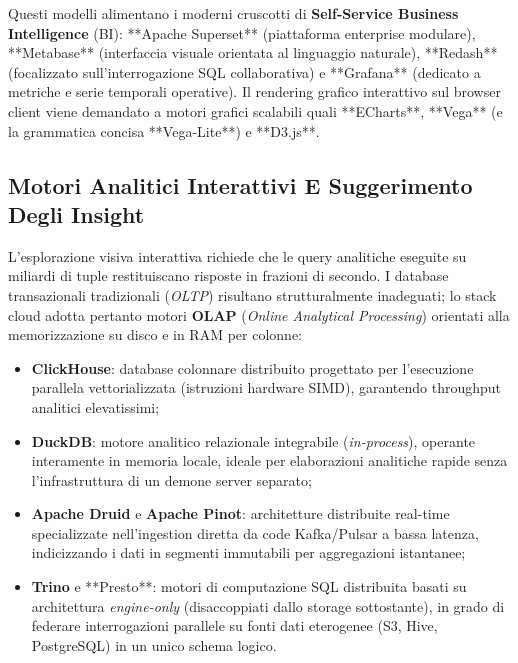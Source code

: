 \documentclass[11pt, a4paper]{article}
\begin{document}
Questi modelli alimentano i moderni cruscotti di \textbf{Self-Service Business Intelligence} (BI): **Apache Superset** (piattaforma enterprise modulare), **Metabase** (interfaccia visuale orientata al linguaggio naturale), **Redash** (focalizzato sull'interrogazione SQL collaborativa) e **Grafana** (dedicato a metriche e serie temporali operative). Il rendering grafico interattivo sul browser client viene demandato a motori grafici scalabili quali **ECharts**, **Vega** (e la grammatica concisa **Vega-Lite**) e **D3.js**.


\subsection{Motori Analitici Interattivi E Suggerimento Degli Insight}

L'esplorazione visiva interattiva richiede che le query analitiche eseguite su miliardi di tuple restituiscano risposte in frazioni di secondo. I database transazionali tradizionali (\emph{OLTP}) risultano strutturalmente inadeguati; lo stack cloud adotta pertanto motori \textbf{OLAP} (\emph{Online Analytical Processing}) orientati alla memorizzazione su disco e in RAM per colonne:
\begin{itemize}
    \item \textbf{ClickHouse}: database colonnare distribuito progettato per l'esecuzione parallela vettorializzata (istruzioni hardware SIMD), garantendo throughput analitici elevatissimi;
    \item \textbf{DuckDB}: motore analitico relazionale integrabile (\emph{in-process}), operante interamente in memoria locale, ideale per elaborazioni analitiche rapide senza l'infrastruttura di un demone server separato;
    \item \textbf{Apache Druid} e \textbf{Apache Pinot}: architetture distribuite real-time specializzate nell'ingestion diretta da code Kafka/Pulsar a bassa latenza, indicizzando i dati in segmenti immutabili per aggregazioni istantanee;
    \item \textbf{Trino} e **Presto**: motori di computazione SQL distribuita basati su architettura \emph{engine-only} (disaccoppiati dallo storage sottostante), in grado di federare interrogazioni parallele su fonti dati eterogenee (S3, Hive, PostgreSQL) in un unico schema logico.
\end{itemize}
\end{document}
